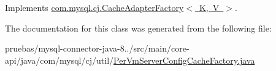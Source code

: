 Implements \mbox{\hyperlink{interfacecom_1_1mysql_1_1cj_1_1_cache_adapter_factory_a6043b2a41c4d79f8a55b11489bf2b0ab}{com.\+mysql.\+cj.\+Cache\+Adapter\+Factory$<$ K, V $>$}}.



The documentation for this class was generated from the following file\+:\begin{DoxyCompactItemize}
\item 
pruebas/mysql-\/connector-\/java-\/8../src/main/core-\/api/java/com/mysql/cj/util/\mbox{\hyperlink{_per_vm_server_config_cache_factory_8java}{Per\+Vm\+Server\+Config\+Cache\+Factory.\+java}}\end{DoxyCompactItemize}
